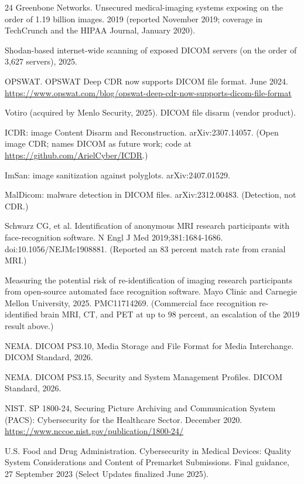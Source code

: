 \documentclass[11pt]{article}
\begin{document}
\begin{thebibliography}{24}
 Greenbone Networks. Unsecured medical-imaging systems exposing on the order of 1.19 billion images. 2019 (reported November 2019; coverage in TechCrunch and the HIPAA Journal, January 2020).

 Shodan-based internet-wide scanning of exposed DICOM servers (on the order of 3,627 servers), 2025.

 OPSWAT. OPSWAT Deep CDR now supports DICOM file format. June 2024. \url{https://www.opswat.com/blog/opswat-deep-cdr-now-supports-dicom-file-format}

 Votiro (acquired by Menlo Security, 2025). DICOM file disarm (vendor product).

 ICDR: image Content Disarm and Reconstruction. arXiv:2307.14057. (Open image CDR; names DICOM as future work; code at \url{https://github.com/ArielCyber/ICDR}.)

 ImSan: image sanitization against polyglots. arXiv:2407.01529.

 MalDicom: malware detection in DICOM files. arXiv:2312.00483. (Detection, not CDR.)

 Schwarz CG, et al. Identification of anonymous MRI research participants with face-recognition software. N Engl J Med 2019;381:1684-1686. doi:10.1056/NEJMc1908881. (Reported an 83 percent match rate from cranial MRI.)

 Measuring the potential risk of re-identification of imaging research participants from open-source automated face recognition software. Mayo Clinic and Carnegie Mellon University, 2025. PMC11714269. (Commercial face recognition re-identified brain MRI, CT, and PET at up to 98 percent, an escalation of the 2019 result above.)

 NEMA. DICOM PS3.10, Media Storage and File Format for Media Interchange. DICOM Standard, 2026.

 NEMA. DICOM PS3.15, Security and System Management Profiles. DICOM Standard, 2026.

 NIST. SP 1800-24, Securing Picture Archiving and Communication System (PACS): Cybersecurity for the Healthcare Sector. December 2020. \url{https://www.nccoe.nist.gov/publication/1800-24/}

 U.S. Food and Drug Administration. Cybersecurity in Medical Devices: Quality System Considerations and Content of Premarket Submissions. Final guidance, 27 September 2023 (Select Updates finalized June 2025).


\end{thebibliography}
\end{document}
